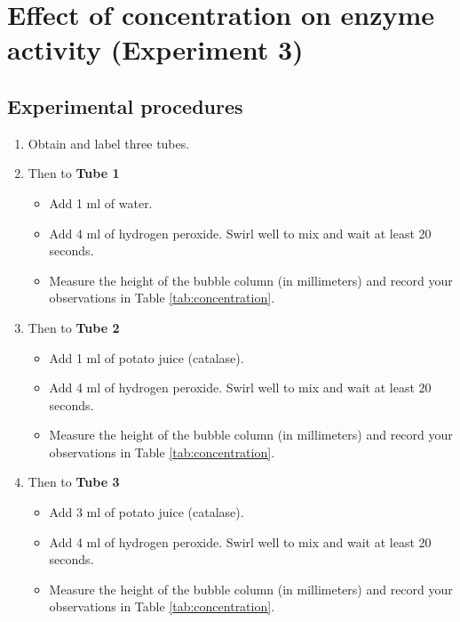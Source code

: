 \section{Effect of concentration on enzyme activity (Experiment
3)}\label{effect-of-concentration-on-enzyme-activity-experiment-3}

\subsection{Experimental procedures}\label{experimental-procedures-22}

\begin{enumerate}
\def\labelenumi{\arabic{enumi}.}
\tightlist
\item
  Obtain and label three tubes.
\item
  Then to \textbf{Tube 1}

  \begin{itemize}
  \tightlist
  \item
    Add 1 ml of water.
  \item
    Add 4 ml of hydrogen peroxide. Swirl well to mix and wait at least
    20 seconds.
  \item
    Measure the height of the bubble column (in millimeters) and record
    your observations in Table \ref{tab:concentration}.
  \end{itemize}
\item
  Then to \textbf{Tube 2}

  \begin{itemize}
  \tightlist
  \item
    Add 1 ml of potato juice (catalase).
  \item
    Add 4 ml of hydrogen peroxide. Swirl well to mix and wait at least
    20 seconds.
  \item
    Measure the height of the bubble column (in millimeters) and record
    your observations in Table \ref{tab:concentration}.
  \end{itemize}
\item
  Then to \textbf{Tube 3}

  \begin{itemize}
  \tightlist
  \item
    Add 3 ml of potato juice (catalase).
  \item
    Add 4 ml of hydrogen peroxide. Swirl well to mix and wait at least
    20 seconds.
  \item
    Measure the height of the bubble column (in millimeters) and record
    your observations in Table \ref{tab:concentration}.
  \end{itemize}
\end{enumerate}

